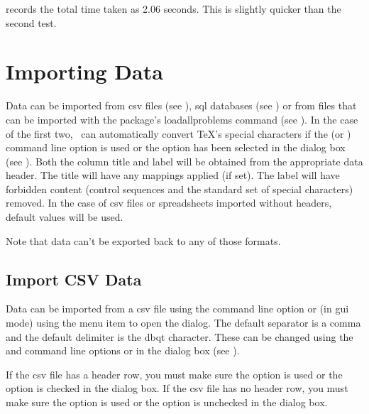   records the total time taken as 2.06 seconds.
  This is slightly quicker than the second  test.


\chapter{Importing Data}\label{sec:import}

   Data can be imported from \gls{csv} files (see 
   ), \gls{sql} databases (see 
   ) or from files that can be imported with 
   the  package's \gls{loadallproblems} command
   (see ). In the case of the first
   two, \appname\ can automatically convert \TeX's special characters if the
    (or ) command line option is used or the
    option has been selected in the 
    dialog box (see ).
   Both the column title and label will be obtained from the appropriate data 
   header.  The title will have any mappings applied (if set). The label will 
   have forbidden content (control sequences and the standard set of special 
   characters) removed. In the case of \gls{csv} files or spreadsheets
   imported without headers, default values will be used.


   Note that data can't be exported back to any of those formats.


\section{Import CSV Data}\label{sec:importcsv}

   Data can be imported from a \gls{csv} file using
   the  command line option or (in \gls{gui} mode)
   using the  menu item to open the 
    dialog. The default
   separator is a \gls{comma} and the default delimiter is the \gls{dbqt}
   character. These can be changed using the  and 
    command line options or in the 
    dialog box (see ).

   If the \gls{csv} file has a header row, you must make sure 
   the  option is used or the 
    option is checked in the
    dialog box.
   If the \gls{csv} file has no header row, you must make sure 
   the  option is used or the 
    option is unchecked in the
    dialog box.


